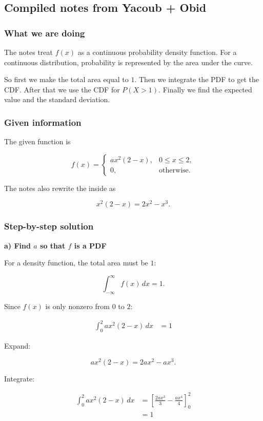 \documentclass[10pt]{article}
\begin{document}
\subsection*{Compiled notes from Yacoub + Obid}

\subsubsection*{What we are doing}
The notes treat $f(x)$ as a continuous probability
density function.
For a continuous distribution, probability is represented
by the area under the curve.

So first we make the total area equal to $1$.
Then we integrate the PDF to get the CDF.
After that we use the CDF for $P(X>1)$.
Finally we find the expected value and the standard deviation.

\subsubsection*{Given information}
The given function is

\[
f(x)=
\begin{cases}
ax^2(2-x),
& 0\leq x\leq 2,\\
0,
& \text{otherwise.}
\end{cases}
\]

The notes also rewrite the inside as

\[
x^2(2-x)=2x^2-x^3.
\]

\subsubsection*{Step-by-step solution}

\textbf{a) Find $a$ so that $f$ is a PDF}

For a density function, the total area must be $1$:

\[
\int_{-\infty}^{\infty} f(x)\,dx=1.
\]

Since $f(x)$ is only nonzero from $0$ to $2$:

\begin{align*}
\int_0^2 ax^2(2-x)\,dx
&=1
\end{align*}

Expand:

\[
ax^2(2-x)=2ax^2-ax^3.
\]

Integrate:

\begin{align*}
\int_0^2 ax^2(2-x)\,dx
&=
\left[
\frac{2ax^3}{3}
-\frac{ax^4}{4}
\right]_0^2 \\[2mm]
&=1
\end{align*}
\end{document}
